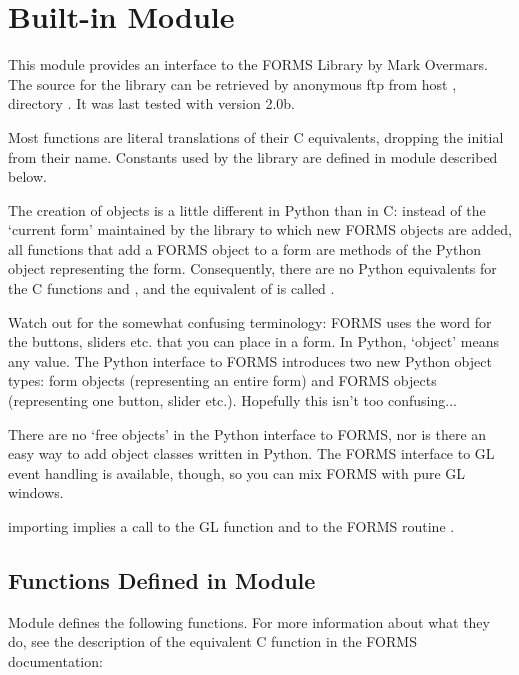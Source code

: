 \section{Built-in Module }

This module provides an interface to the FORMS Library by Mark
Overmars.  The source for the library can be retrieved by anonymous
ftp from host , directory .  It
was last tested with version 2.0b.

Most functions are literal translations of their C equivalents,
dropping the initial  from their name.  Constants used by
the library are defined in module  described below.

The creation of objects is a little different in Python than in C:
instead of the `current form' maintained by the library to which new
FORMS objects are added, all functions that add a FORMS object to a
form are methods of the Python object representing the form.
Consequently, there are no Python equivalents for the C functions
 and , and the equivalent of
 is called .

Watch out for the somewhat confusing terminology: FORMS uses the word
 for the buttons, sliders etc. that you can place in a form.
In Python, `object' means any value.  The Python interface to FORMS
introduces two new Python object types: form objects (representing an
entire form) and FORMS objects (representing one button, slider etc.).
Hopefully this isn't too confusing...

There are no `free objects' in the Python interface to FORMS, nor is
there an easy way to add object classes written in Python.  The FORMS
interface to GL event handling is available, though, so you can mix
FORMS with pure GL windows.

 importing  implies a call to the GL function
 and to the FORMS routine .

\subsection{Functions Defined in Module }

Module  defines the following functions.  For more information
about what they do, see the description of the equivalent C function
in the FORMS documentation:

